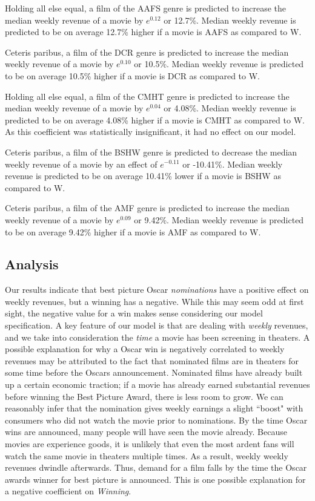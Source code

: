 \documentclass[10.7pt]{article} %
\begin{document}
Holding all else equal, a film of the AAFS genre is predicted to increase the median weekly revenue of a movie by $e^{0.12}$ or 12.7\%. Median weekly revenue is predicted to be on average 12.7\% higher if a movie is AAFS as compared to W.

Ceteris paribus, a film of the DCR genre is predicted to increase the median weekly revenue of a movie by $e^{0.10}$ or 10.5\%. Median weekly revenue is predicted to be on average 10.5\% higher if a movie is DCR as compared to W.

Holding all else equal, a film of the CMHT genre is predicted to increase the median weekly revenue of a movie by $e^{0.04}$ or 4.08\%. Median weekly revenue is predicted to be on average 4.08\% higher if a movie is CMHT as compared to W. As this coefficient was statistically insignificant, it had no effect on our model.

Ceteris paribus, a film of the BSHW genre is predicted to decrease the median weekly revenue of a movie by an effect of $e^{-0.11}$ or -10.41\%. Median weekly revenue is predicted to be on average 10.41\% lower if a movie is BSHW as compared to W.

Ceteris paribus, a film of the AMF genre is predicted to increase the median weekly revenue of a movie by $e^{0.09}$ or 9.42\%. Median weekly revenue is predicted to be on average 9.42\% higher if a movie is AMF as compared to W.


\subsection{Analysis}

Our results indicate that best picture Oscar \textit{nominations} have a positive effect on weekly revenues, but a winning has a negative. While this may seem odd at first sight, the negative value for a win makes sense considering our model specification. A key feature of our model is that are dealing with \textit{weekly} revenues, and we take into consideration the \textit{time} a movie has been screening in theaters. A possible explanation for why a Oscar win is negatively correlated to weekly revenues may be attributed to the fact that nominated films are in theaters for some time before the Oscars announcement. Nominated films have already built up a certain economic traction; if a movie has already earned substantial revenues before winning the Best Picture Award, there is less room to grow. We can reasonably infer that the nomination gives weekly earnings a slight ``boost" with consumers who did not watch the movie prior to nominations. By the time Oscar wins are announced, many people will have seen the movie already. Because movies are experience goods, it is unlikely that even the most ardent fans will watch the same movie in theaters multiple times. As a result, weekly weekly revenues dwindle afterwards. Thus, demand for a film falls by the time the Oscar awards winner for best picture is announced. This is one possible explanation for a negative coefficient on \emph{Winning}.
\end{document}

